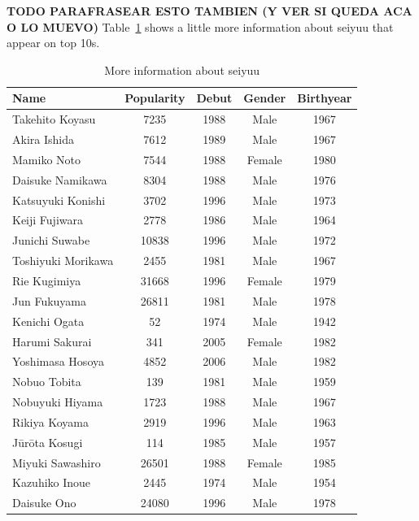 \textbf{TODO PARAFRASEAR ESTO TAMBIEN (Y VER SI QUEDA ACA O LO MUEVO)}
Table~\ref{tab:moreInfoSeiyuu} shows a little more information about seiyuu that appear on top 10s.
\begin{table}[!hbt]
	\begin{center}
	\caption{More information about seiyuu}
	\label{tab:moreInfoSeiyuu}
	\begin{tabular}{|l|c|c|c|c|}
		\hline
		Name & Popularity & Debut & Gender & Birthyear \\
		\hline
		Takehito Koyasu & 7235 & 1988 & Male & 1967 \\
		\hline
		Akira Ishida & 7612 & 1989 & Male & 1967 \\
		\hline
		Mamiko Noto & 7544 & 1988 & Female & 1980 \\
		\hline
		Daisuke Namikawa & 8304 & 1988 & Male & 1976 \\
		\hline
		Katsuyuki Konishi & 3702 & 1996 & Male & 1973 \\
		\hline
		Keiji Fujiwara & 2778 & 1986 & Male & 1964 \\
		\hline
		Junichi Suwabe & 10838 & 1996 & Male & 1972 \\
		\hline
		Toshiyuki Morikawa & 2455 & 1981 & Male & 1967 \\
		\hline
		Rie Kugimiya & 31668 & 1996 & Female & 1979 \\
		\hline
		Jun Fukuyama & 26811 & 1981 & Male & 1978 \\
		\hline
		Kenichi Ogata & 52 & 1974 & Male & 1942 \\
		\hline
		Harumi Sakurai & 341 & 2005 & Female & 1982 \\
		\hline
		Yoshimasa Hosoya & 4852 & 2006 & Male & 1982 \\
		\hline
		Nobuo Tobita & 139 & 1981 & Male & 1959 \\
		\hline
		Nobuyuki Hiyama & 1723 & 1988 & Male & 1967 \\
		\hline
		Rikiya Koyama & 2919 & 1996 & Male & 1963 \\
		\hline
		Jūrōta Kosugi & 114 & 1985 & Male & 1957 \\
		\hline
		Miyuki Sawashiro & 26501 & 1988 & Female & 1985 \\
		\hline
		Kazuhiko Inoue & 2445 & 1974 & Male & 1954 \\
		\hline
		Daisuke Ono & 24080 & 1996 & Male & 1978 \\
		\hline
	\end{tabular}
	\end{center}
\end{table}
